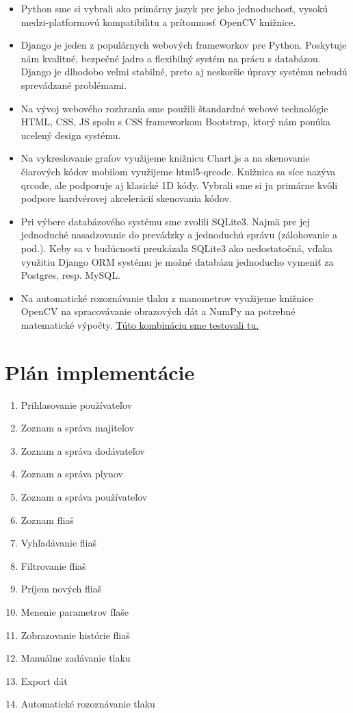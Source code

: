 \documentclass{zah}
\begin{document}
\begin{itemize}
\item Python sme si vybrali ako primárny jazyk pre jeho jednoduchosť,
	vysokú medzi-platformovú kompatibilitu a prítomnosť OpenCV knižnice.
\item Django je jeden z populárnych webových frameworkov pre Python. 
	Poskytuje nám kvalitné, bezpečné jadro a flexibilný 
	systém na prácu s databázou. Django je dlhodobo veľmi stabilné,
	preto aj neskoršie úpravy systému nebudú sprevádzané problémami.
\item Na vývoj webového rozhrania sme použili štandardné webové technológie
	HTML, CSS, JS spolu s CSS frameworkom Bootstrap, ktorý nám ponúka ucelený
	design systému.
\item Na vykreslovanie grafov využijeme knižnicu Chart.js a na skenovanie čiarových
	kódov mobilom využijeme html5-qrcode. Knižnica sa síce nazýva qrcode, ale podporuje
	aj klasické 1D kódy. Vybrali sme si ju primárne kvôli podpore hardvérovej akcelerácií
	skenovania kódov.
\item Pri výbere databázového systému sme zvolili SQLite3. Najmä pre jej jednoduché
	nasadzovanie do prevádzky a jednoduchú správu (zálohovanie a pod.). Keby sa v budúcnosti
	preukázala SQLite3 ako nedostatočná, vďaka využitiu Django ORM systému je možné databázu
	jednoducho vymeniť za Postgres, resp. MySQL.
\item Na automatické rozoznávanie tlaku z manometrov využijeme knižnice OpenCV na 
	spracovávanie obrazových dát a NumPy na potrebné matematické výpočty.
	\href{https://github.com/TIS2023-FMFI/evidencia-flias/tree/Manometre-demo/Demo}{Túto kombináciu sme testovali tu.}
\end{itemize}

\section{Plán implementácie}

\begin{enumerate}
	\item Prihlasovanie používateľov
	\item Zoznam a správa majiteľov
	\item Zoznam a správa dodávateľov
	\item Zoznam a správa plynov
	\item Zoznam a správa používateľov
	\item Zoznam fliaš
	\item Vyhľadávanie fliaš
	\item Filtrovanie fliaš
	\item Príjem nových fliaš
	\item Menenie parametrov fľaše
	\item Zobrazovanie histórie fliaš
	\item Manuálne zadávanie tlaku
	\item Export dát
	\item Automatické rozoznávanie tlaku
\end{enumerate}
\end{document}
